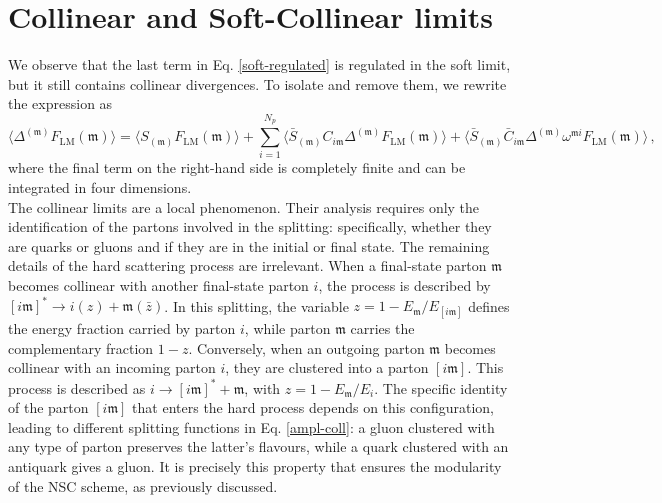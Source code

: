 \documentclass[a4paper, 12pt]{book}
\newcommand{\um}{\mathfrak{m}}
\begin{document}

\section{Collinear and Soft-Collinear limits}
We observe that the last term in Eq. \ref{soft-regulated} is regulated in the soft limit, but it still contains collinear divergences. To isolate and remove them, we rewrite the expression as 
\begin{equation}
  \langle \Delta^{(\um)}F_{\mathrm{LM}}(\um) \rangle = \langle S_{(\um)}F_{\mathrm{LM}}(\um) \rangle + \sum_{i=1}^{N_p} \langle \bar{S}_{(\um)}C_{i\um} \Delta^{(\um)} F_{\mathrm{LM}}(\um) \rangle + \langle \bar{S}_{(\um)} \bar{C}_{i\um} \Delta^{(\um)} \omega^{\um i} F_{\mathrm{LM}}(\um) \rangle \, ,
\end{equation}
where the final term on the right-hand side is completely finite and can be integrated in four dimensions. \\
The collinear limits are a local phenomenon. Their analysis requires only the identification of the partons involved in the splitting: specifically, whether they are quarks or gluons and if they are in the initial or final state. The remaining details of the hard scattering process are irrelevant. When a final-state parton $\um$ becomes collinear with another final-state parton $i$, the process is described by $[i\um]^* \to i(z) + \um(\bar{z})$. In this splitting, the variable $z = 1 - E_{\um}/E_{[i\um]}$ defines the energy fraction carried by parton $i$, while parton $\um$ carries the complementary fraction $1-z$. Conversely, when an outgoing parton $\um$ becomes collinear with an incoming parton $i$, they are clustered into a parton $[i\um]$. This process is described as $i \to [i\um]^* + \um$, with $z = 1 - E_{\um}/E_i$. The specific identity of the parton $[i\um]$ that enters the hard process depends on this configuration, leading to different splitting functions in Eq. \ref{ampl-coll}: a gluon clustered with any type of parton preserves the latter's flavours, while a quark clustered with an antiquark gives a gluon. It is precisely this property that ensures the modularity of the NSC scheme, as previously discussed. \\
\end{document}
